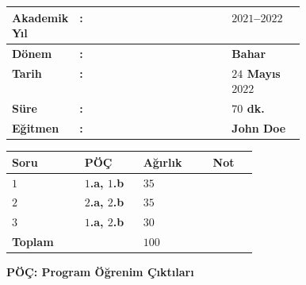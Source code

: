 \documentclass[a4paper, 11pt]{article}
\begin{document}
	\begin{table}[!ht]
		\renewcommand{\arraystretch}{1.1}
		\centering
		\begin{tabular}{@{}>{\bfseries}L{0.18\linewidth}>{\bfseries}C{0.00\linewidth}>{\bfseries}L{0.25\linewidth}@{}}
			\toprule
			Akademik Yıl  & : & $2021$--$2022$                  \\ 
			\midrule
			Dönem         & : & \textbf{Bahar}                             \\ 
			\midrule
			Tarih         & : & $24$ Mayıs $2022$                           \\ 
			\midrule
			Süre          & : & $70$ \textbf{dk.}                \\
			\midrule
			Eğitmen & : & John Doe \\
			\bottomrule
		\end{tabular}
		\hfill
		\renewcommand{\arraystretch}{1.1}
		\begin{tabular}{>{\bfseries}C{0.1\linewidth}>{\bfseries}C{0.1\linewidth}>{\bfseries}C{0.1\linewidth}>{\bfseries}C{0.06\linewidth}}
			Soru & PÖÇ      & Ağırlık & Not \\
			\toprule
			$1$ & $1$.a, $1$.b & $35$    & ~   \\
			\midrule
			$2$ & $2$.a, $2$.b & $35$    & ~   \\
			\midrule
			$3$ & $1$.a, $2$.b & $30$    & ~   \\
			\midrule
			Toplam    & ~              		  & $100$   & ~   \\
			\bottomrule
		\end{tabular}
		\vspace{-0.3cm}
		\begin{flushright}
			\textbf{PÖÇ: Program Öğrenim Çıktıları}
		\end{flushright}
	\end{table}
	\vspace{-1cm}
	
\end{document}
